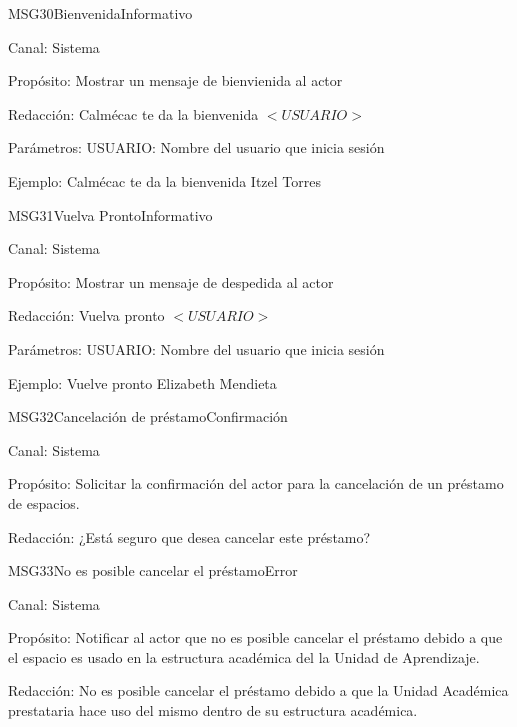 \begin{mensaje}{MSG30}{Bienvenida}{Informativo}
	\item[Canal:] Sistema
	\item[Propósito:] Mostrar un mensaje de bienvienida al actor
	\item[Redacción:] Calmécac te da la bienvenida $<USUARIO>$
	\item[Parámetros:] USUARIO: Nombre del usuario que inicia sesión
	\item[Ejemplo:] Calmécac te da la bienvenida Itzel Torres
\end{mensaje}

\begin{mensaje}{MSG31}{Vuelva Pronto}{Informativo}
	\item[Canal:] Sistema
	\item[Propósito:] Mostrar un mensaje de despedida al actor
	\item[Redacción:] Vuelva pronto $<USUARIO>$
	\item[Parámetros:] USUARIO: Nombre del usuario que inicia sesión
	\item[Ejemplo:] Vuelve pronto Elizabeth Mendieta
\end{mensaje}


\begin{mensaje}{MSG32}{Cancelación de préstamo}{Confirmación}
	\item[Canal:] Sistema
	\item[Propósito:] Solicitar la confirmación del actor para la cancelación de un préstamo de espacios.
	\item[Redacción:] ¿Está seguro que desea cancelar este préstamo?
	
\end{mensaje}

\begin{mensaje}{MSG33}{No es posible cancelar el préstamo}{Error}
	\item[Canal:] Sistema
	\item[Propósito:] Notificar al actor que no es posible cancelar el préstamo debido a que el espacio es usado en la estructura académica del la Unidad de Aprendizaje.
	\item[Redacción:] No es posible cancelar el préstamo debido a que la Unidad Académica prestataria hace uso del mismo dentro de su estructura académica.
	
\end{mensaje}

